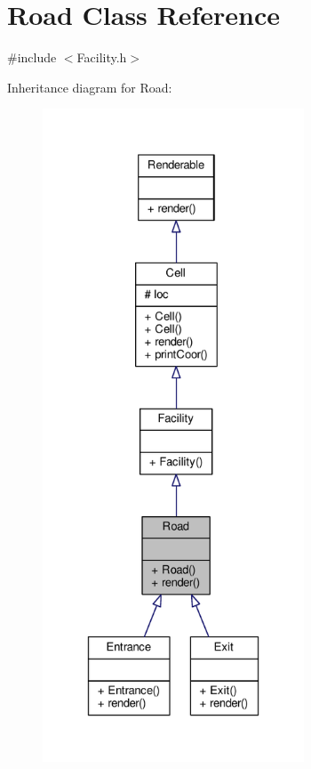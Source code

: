 \hypertarget{classRoad}{}\section{Road Class Reference}
\label{classRoad}


{\ttfamily \#include $<$Facility.\+h$>$}



Inheritance diagram for Road\+:
\nopagebreak
\begin{figure}[H]
\begin{center}
\leavevmode
\includegraphics[height=550pt]{classRoad__inherit__graph}
\end{center}
\end{figure}


